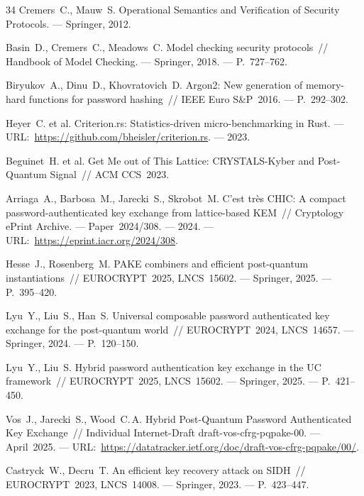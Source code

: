 \documentclass{llncs}
\begin{document}
\begin{thebibliography}{34}
Cremers~C., Mauw~S.
Operational Semantics and Verification of Security Protocols. --- Springer, 2012.

Basin~D., Cremers~C., Meadows~C.
Model checking security protocols~//
Handbook of Model Checking. --- Springer, 2018. --- P.~727--762.

Biryukov~A., Dinu~D., Khovratovich~D.
Argon2: New generation of memory-hard functions for password hashing~//
IEEE Euro S\&P~2016. --- P.~292--302.

Heyer~C. et al.
Criterion.rs: Statistics-driven micro-benchmarking in Rust. ---
URL:~\url{https://github.com/bheisler/criterion.rs}. --- 2023.

Beguinet~H. et al.
Get Me out of This Lattice: CRYSTALS-Kyber and Post-Quantum Signal~//
ACM CCS~2023.

Arriaga~A., Barbosa~M., Jarecki~S., Skrobot~M.
C'est tr\`es CHIC: A compact password-authenticated key exchange from lattice-based KEM~//
Cryptology ePrint Archive. --- Paper~2024/308. --- 2024. ---
URL:~\url{https://eprint.iacr.org/2024/308}.

Hesse~J., Rosenberg~M.
PAKE combiners and efficient post-quantum instantiations~//
EUROCRYPT~2025, LNCS~15602. --- Springer, 2025. --- P.~395--420.

Lyu~Y., Liu~S., Han~S.
Universal composable password authenticated key exchange for the post-quantum world~//
EUROCRYPT~2024, LNCS~14657. --- Springer, 2024. --- P.~120--150.

Lyu~Y., Liu~S.
Hybrid password authentication key exchange in the UC framework~//
EUROCRYPT~2025, LNCS~15602. --- Springer, 2025. --- P.~421--450.

Vos~J., Jarecki~S., Wood~C.\,A.
Hybrid Post-Quantum Password Authenticated Key Exchange~//
Individual Internet-Draft draft-vos-cfrg-pqpake-00. --- April~2025. ---
URL:~\url{https://datatracker.ietf.org/doc/draft-vos-cfrg-pqpake/00/}.

Castryck~W., Decru~T.
An efficient key recovery attack on SIDH~//
EUROCRYPT~2023, LNCS~14008. --- Springer, 2023. --- P.~423--447.

\end{thebibliography}
\end{document}
